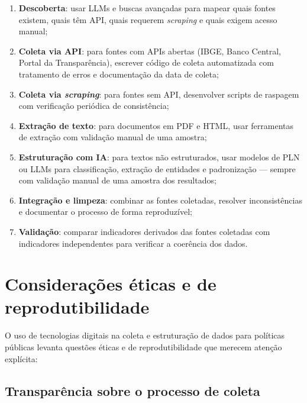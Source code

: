 \begin{enumerate}
  \item \textbf{Descoberta}: usar LLMs e buscas avançadas para mapear quais fontes existem, quais têm API, quais requerem \textit{scraping} e quais exigem acesso manual;

  \item \textbf{Coleta via API}: para fontes com APIs abertas (IBGE, Banco Central, Portal da Transparência), escrever código de coleta automatizada com tratamento de erros e documentação da data de coleta;

  \item \textbf{Coleta via \textit{scraping}}: para fontes sem API, desenvolver scripts de raspagem com verificação periódica de consistência;

  \item \textbf{Extração de texto}: para documentos em PDF e HTML, usar ferramentas de extração com validação manual de uma amostra;

  \item \textbf{Estruturação com IA}: para textos não estruturados, usar modelos de PLN ou LLMs para classificação, extração de entidades e padronização --- sempre com validação manual de uma amostra dos resultados;

  \item \textbf{Integração e limpeza}: combinar as fontes coletadas, resolver inconsistências e documentar o processo de forma reproduzível;

  \item \textbf{Validação}: comparar indicadores derivados das fontes coletadas com indicadores independentes para verificar a coerência dos dados.
\end{enumerate}

\section{Considerações éticas e de reprodutibilidade}

O uso de tecnologias digitais na coleta e estruturação de dados para políticas públicas levanta questões éticas e de reprodutibilidade que merecem atenção explícita:

\subsection{Transparência sobre o processo de coleta}

